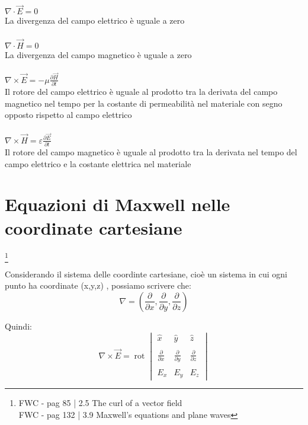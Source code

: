 \begin{tcolorbox}
    $\nabla \cdot \vec{E} = 0 $\\ 
    La divergenza del campo elettrico è uguale a zero \\ \\ 

    $\nabla \cdot \vec{H} = 0$ \\
    La divergenza del campo magnetico è uguale a zero \\ \\ 
    
    $\nabla \times \vec{E} = -\mu \frac{\partial \vec{H}}{\partial t}$ \\  
    Il rotore del campo elettrico è uguale al prodotto tra la derivata del campo magnetico nel tempo per la costante di permeabilità 
    nel materiale con segno opposto rispetto al campo elettrico \\ \\ 

    $\nabla \times \vec{H} = \varepsilon \frac{\partial \vec{E}}{\partial t}$ \\ 
    Il rotore del campo magnetico è uguale al prodotto tra la derivata nel tempo del campo elettrico e la costante elettrica nel materiale



\end{tcolorbox} 

\newpage 
\section{Equazioni di Maxwell nelle coordinate cartesiane} 

\footnote{FWC - pag 85 | 2.5 The curl of a  vector field \\ FWC - pag 132 | 3.9 Maxwell's equations and plane waves } 


Considerando il sistema delle coordinte cartesiane, cioè un sistema in cui ogni punto ha coordinate (x,y,z) , possiamo scrivere che: \\ 

{
    \Large 
    \begin{equation}
 \nabla = (\frac{\partial}{\partial x} , \frac{\partial}{\partial y} , \frac{\partial}{\partial z})
    \end{equation}
}

Quindi: \\ 

{
    \Large
    \begin{equation}
        \nabla \times \vec{E} = \operatorname{rot} 
\begin{vmatrix}
    \hat{x} & \hat{y} &\hat{z} \\ \\ 
    \frac{\partial}{\partial x} & \frac{\partial}{\partial y} & \frac{\partial}{\partial z} \\ \\ 
    E_x & E_y & E_z
\end{vmatrix}  
    \end{equation}
}

